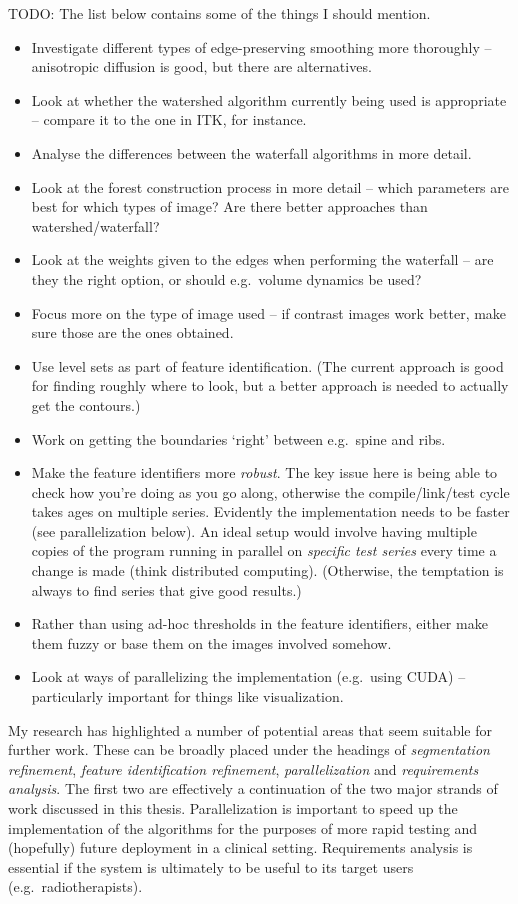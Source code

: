TODO: The list below contains some of the things I should mention.
%
\begin{itemize}
\item Investigate different types of edge-preserving smoothing more thoroughly -- anisotropic diffusion is good, but there are alternatives.
\item Look at whether the watershed algorithm currently being used is appropriate -- compare it to the one in ITK, for instance.
\item Analyse the differences between the waterfall algorithms in more detail.
\item Look at the forest construction process in more detail -- which parameters are best for which types of image? Are there better approaches than watershed/waterfall?
\item Look at the weights given to the edges when performing the waterfall -- are they the right option, or should e.g.~volume dynamics be used?
\item Focus more on the type of image used -- if contrast images work better, make sure those are the ones obtained.
\item Use level sets as part of feature identification. (The current approach is good for finding roughly where to look, but a better approach is needed to actually get the contours.)
\item Work on getting the boundaries `right' between e.g.~spine and ribs.
\item Make the feature identifiers more \emph{robust}. The key issue here is being able to check how you're doing as you go along, otherwise the compile/link/test cycle takes ages on multiple series. Evidently the implementation needs to be faster (see parallelization below). An ideal setup would involve having multiple copies of the program running in parallel on \emph{specific test series} every time a change is made (think distributed computing). (Otherwise, the temptation is always to find series that give good results.)
\item Rather than using ad-hoc thresholds in the feature identifiers, either make them fuzzy or base them on the images involved somehow.
\item Look at ways of parallelizing the implementation (e.g.~using CUDA) -- particularly important for things like visualization.
\end{itemize}

\fi

My research has highlighted a number of potential areas that seem suitable for further work. These can be broadly placed under the headings of \emph{segmentation refinement}, \emph{feature identification refinement}, \emph{parallelization} and \emph{requirements analysis}. The first two are effectively a continuation of the two major strands of work discussed in this thesis. Parallelization is important to speed up the implementation of the algorithms for the purposes of more rapid testing and (hopefully) future deployment in a clinical setting. Requirements analysis is essential if the system is ultimately to be useful to its target users (e.g.~radiotherapists).

